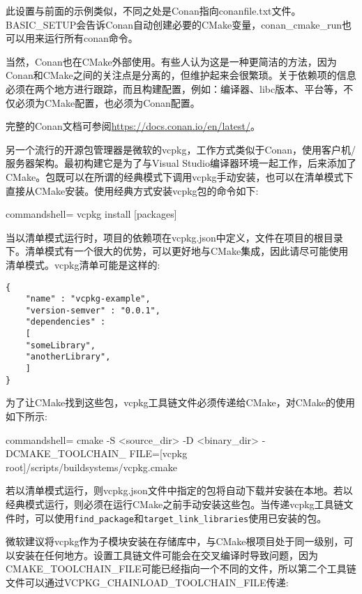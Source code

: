此设置与前面的示例类似，不同之处是Conan指向conanfile.txt文件。BASIC\_SETUP会告诉Conan自动创建必要的CMake变量，conan\_cmake\_run也可以用来运行所有conan命令。

当然，Conan也在CMake外部使用。有些人认为这是一种更简洁的方法，因为Conan和CMake之间的关注点是分离的，但维护起来会很繁琐。关于依赖项的信息必须在两个地方进行跟踪，而且构建配置，例如：编译器、libc版本、平台等，不仅必须为CMake配置，也必须为Conan配置。

完整的Conan文档可参阅\url{https://docs.conan.io/en/latest/}。


另一个流行的开源包管理器是微软的vcpkg，工作方式类似于Conan，使用客户机/服务器架构。最初构建它是为了与Visual Studio编译器环境一起工作，后来添加了CMake。包既可以在所谓的经典模式下调用vcpkg手动安装，也可以在清单模式下直接从CMake安装。使用经典方式安装vcpkg包的命令如下:

\begin{tcblisting}{commandshell={}}
vcpkg install [packages]
\end{tcblisting}

当以清单模式运行时，项目的依赖项在vcpkg.json中定义，文件在项目的根目录下。清单模式有一个很大的优势，可以更好地与CMake集成，因此请尽可能使用清单模式。vcpkg清单可能是这样的:

\begin{lstlisting}[style=styleCMake]
{
	"name" : "vcpkg-example",
	"version-semver" : "0.0.1",
	"dependencies" :
	[
	"someLibrary",
	"anotherLibrary",
	] 
}
\end{lstlisting}

为了让CMake找到这些包，vcpkg工具链文件必须传递给CMake，对CMake的使用如下所示:

\begin{tcblisting}{commandshell={}}
cmake -S <source_dir> -D <binary_dir> -DCMAKE_TOOLCHAIN_
  FILE=[vcpkg root]/scripts/buildsystems/vcpkg.cmake
\end{tcblisting}

若以清单模式运行，则vcpkg.json文件中指定的包将自动下载并安装在本地。若以经典模式运行，则必须在运行CMake之前手动安装这些包。当传递vcpkg工具链文件时，可以使用\texttt{find\_package}和\texttt{target\_link\_libraries}使用已安装的包。

微软建议将vcpkg作为子模块安装在存储库中，与CMake根项目处于同一级别，可以安装在任何地方。设置工具链文件可能会在交叉编译时导致问题，因为CMAKE\_TOOLCHAIN\_FILE可能已经指向一个不同的文件，所以第二个工具链文件可以通过VCPKG\_CHAINLOAD\_TOOLCHAIN\_FILE传递:

